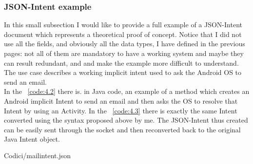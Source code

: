 \subsubsection{JSON-Intent example}
In this small subsection I would like to provide a full example of a JSON-Intent document which represents a theoretical proof of concept. Notice that I did not use all the fields, and obviously all the data types, I have defined in the previous pages: not all of them are
mandatory to have a working system and maybe they can result redundant, and and make the example more difficult to understand.\\
The use case describes a working implicit intent used to ask the Android OS to send an email.\\
In the \lstlistingname~\ref{code:4.2} there is. in Java code, an example of a method which creates an Android implicit Intent to send an email and then asks the OS to resolve that Intent by using an Activity. In the \lstlistingname~\ref{code:4.3} there is exactly the same Intent converted using the syntax proposed above by me. The JSON-Intent thus created can be easily sent through the socket and then reconverted back to the original Java Intent object.

\begin{lstinputlisting}[
	morekeywords={action, itype, category, categories, extras, type, data, key},
	caption={Conversion of the Intent in Listing \ref{code:4.2} to JSON-Intent},
	label=code:4.3]
	{Codici/mailintent.json}
\end{lstinputlisting}
